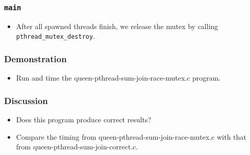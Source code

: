 \documentclass{beamer}
\begin{document}
\begin{frame}
\frametitle{\tt main}
\begin{itemize}
\item After all spawned threads finish, we release the mutex by calling
{\tt pthread\_mutex\_destroy}.
\end{itemize}
\end{frame}

\begin{frame}
\frametitle{Demonstration}
\begin{itemize}
\item Run and time the queen-pthread-sum-join-race-mutex.c program.
\end{itemize}
\end{frame}

\begin{frame}
\frametitle{Discussion}
\begin{itemize}
\item Does this program produce correct results?
\item Compare the timing from queen-pthread-sum-join-race-mutex.c with
  that from queen-pthread-sum-join-correct.c.  
\end{itemize}
\end{frame}
\end{document}
